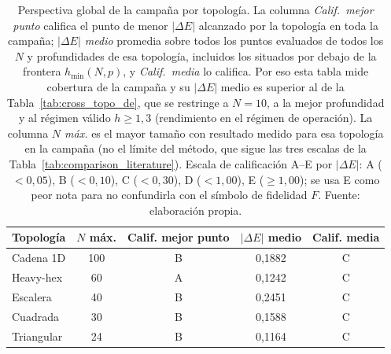 \begin{table}[htbp]
\centering
\caption[Perspectiva global de la campaña por topología]{Perspectiva global de la campaña por topología. La columna \emph{Calif.\ mejor punto} califica el punto de menor $|\Delta E|$ alcanzado por la topología en toda la campaña; \emph{$|\Delta E|$ medio} promedia sobre todos los puntos evaluados de todos los $N$ y profundidades de esa topología, incluidos los situados por debajo de la frontera $h_{\min}(N, p)$, y \emph{Calif.\ media} lo califica. Por eso esta tabla mide cobertura de la campaña y su $|\Delta E|$ medio es superior al de la Tabla~\ref{tab:cross_topo_de}, que se restringe a $N = 10$, a la mejor profundidad y al régimen válido $h \geq 1{,}3$ (rendimiento en el régimen de operación). La columna \emph{$N$ máx.} es el mayor tamaño con resultado medido para esa topología en la campaña (no el límite del método, que sigue las tres escalas de la Tabla~\ref{tab:comparison_literature}). Escala de calificación A--E por $|\Delta E|$: A ($<0{,}05$), B ($<0{,}10$), C ($<0{,}30$), D ($<1{,}00$), E ($\geq 1{,}00$); se usa E como peor nota para no confundirla con el símbolo de fidelidad $F$. Fuente: elaboración propia.}
\label{tab:auto_scoreboard}
\begin{tabular}{lcccc}
\toprule
Topología & $N$ máx. & Calif. mejor punto & $|\Delta E|$ medio & Calif. media \\
\midrule
Cadena 1D & 100 & B & 0,1882 & C \\
Heavy-hex & 60 & A & 0,1242 & C \\
Escalera & 40 & B & 0,2451 & C \\
Cuadrada & 30 & B & 0,1588 & C \\
Triangular & 24 & B & 0,1164 & C \\
\bottomrule
\end{tabular}
\end{table}
